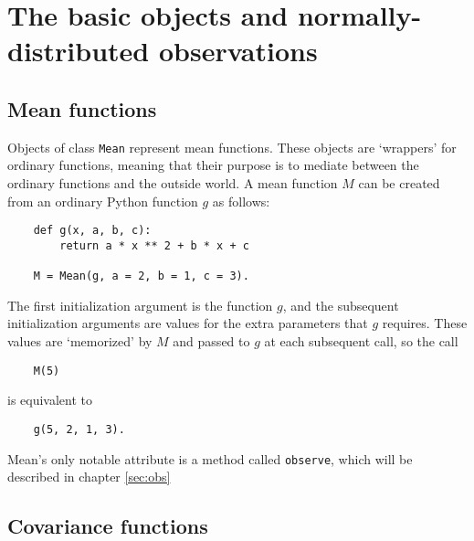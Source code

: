 \documentclass{report}
\begin{document}
\chapter{The basic objects and normally-distributed observations}\label{cha:basics} %
\section{Mean functions}

Objects of class \texttt{Mean} represent mean functions. These objects are `wrappers' for ordinary functions, meaning that their purpose is to mediate between the ordinary functions and the outside world. A mean function $M$ can be created from an ordinary Python function $g$ as follows:
\begin{verbatim}
    def g(x, a, b, c):
        return a * x ** 2 + b * x + c

    M = Mean(g, a = 2, b = 1, c = 3).
\end{verbatim}
The first initialization argument is the function $g$, and the subsequent initialization arguments are values for the extra parameters that $g$ requires. These values are `memorized' by $M$ and passed to $g$ at each subsequent call, so the call
\begin{verbatim}
    M(5)
\end{verbatim}
is equivalent to
\begin{verbatim}
    g(5, 2, 1, 3).
\end{verbatim}
Mean's only notable attribute is a method called \texttt{observe}, which will be described in chapter \ref{sec:obs}

\section{Covariance functions} \label{sec:cov}
\end{document}
